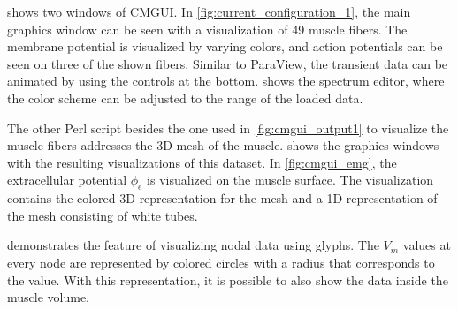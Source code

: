  shows two windows of CMGUI. In \cref{fig:current_configuration_1}, the main graphics window can be seen with a visualization of 49 muscle fibers. The membrane potential is visualized by varying colors, and action potentials can be seen on three of the shown fibers. Similar to ParaView, the transient data can be animated by using the controls at the bottom.
 shows the spectrum editor, where the color scheme can be adjusted to the range of the loaded data.

The other Perl script besides the one used in \cref{fig:cmgui_output1} to visualize the muscle fibers addresses the 3D mesh of the muscle.
 shows the graphics windows with the resulting visualizations of this dataset. In \cref{fig:cmgui_emg}, the extracellular potential $\phi_e$ is visualized on the muscle surface. The visualization contains the colored 3D representation for the mesh and a 1D representation of the mesh consisting of white tubes.

 demonstrates the feature of visualizing nodal data using glyphs. The $V_m$ values at every node are represented by colored circles with a radius that corresponds to the value. With this representation, it is possible to also show the data inside the muscle volume.

